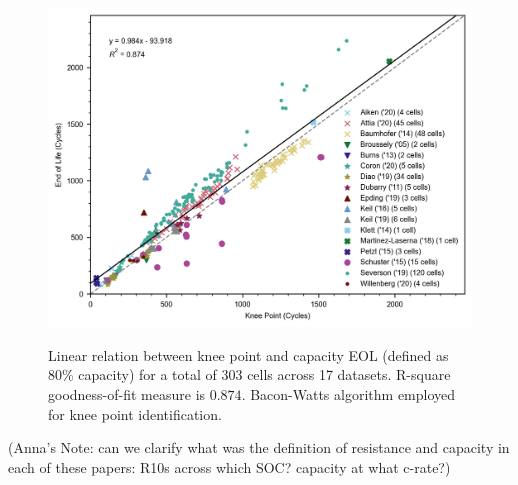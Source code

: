 \documentclass[journal=jpclcd,manuscript=article]{achemso}
\begin{document}
\begin{figure}[ht]
\centering
\includegraphics[scale=1.10]{figures/knee_point_eol_linear_relations}
  \label{fig:kneepoint2EOL}
\caption{Linear relation between knee point and capacity EOL (defined as 80\% capacity) for a total of 303 cells across 17 datasets. R-square goodness-of-fit measure is $0.874$. Bacon-Watts algorithm employed for knee point identification. }
\label{fig:knees2EOL}
\end{figure}
(Anna's Note: can we clarify what was the definition of resistance and capacity in each of these papers: R10s across which SOC? capacity at what c-rate?)
\end{document}
